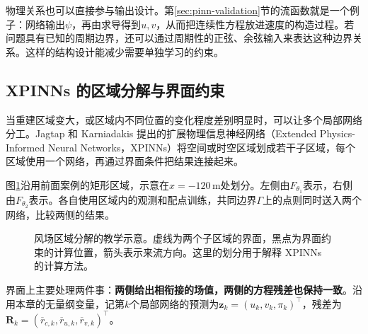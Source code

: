 物理关系也可以直接参与输出设计。第\ref{sec:pinn-validation}节的流函数就是一个例子：网络输出$\psi$，再由求导得到$u,v$，从而把连续性方程放进速度的构造过程。若问题具有已知的周期边界，还可以通过周期性的正弦、余弦输入来表达这种边界关系。这样的结构设计能减少需要单独学习的约束。

\subsection{XPINNs 的区域分解与界面约束}
当重建区域变大，或区域内不同位置的变化程度差别明显时，可以让多个局部网络分工。Jagtap 和 Karniadakis 提出的扩展物理信息神经网络（Extended Physics-Informed Neural Networks，XPINNs）将空间或时空区域划成若干子区域，每个区域使用一个网络，再通过界面条件把结果连接起来\cite{jagtap2020xpinn}。

图\ref{fig:pinn-xpinn-domain}沿用前面案例的矩形区域，示意在$x=-120\,\mathrm{m}$处划分。左侧由$F_{\theta_1}$表示，右侧由$F_{\theta_2}$表示。各自使用区域内的观测和配点训练，共同边界$\Gamma$上的点则同时送入两个网络，比较两侧的结果。

\begin{figure}[htbp]
\centering
{}
\caption{风场区域分解的教学示意。虚线为两个子区域的界面，黑点为界面约束的计算位置，箭头表示来流方向。这里的划分用于解释 XPINNs 的计算方法。}
\label{fig:pinn-xpinn-domain}
\end{figure}

界面上主要处理两件事：\textbf{两侧给出相衔接的场值，两侧的方程残差也保持一致}。沿用本章的无量纲变量，记第$k$个局部网络的预测为$\mathbf z_k=(u_k,v_k,\pi_k)^\top$，残差为$\mathbf R_k=(\overline r_{c,k},\overline r_{u,k},\overline r_{v,k})^\top$。

